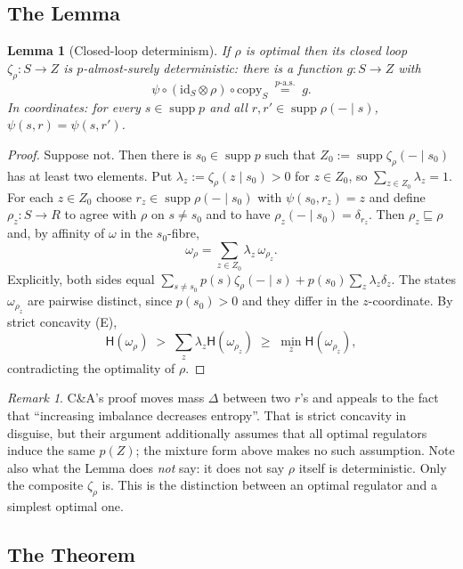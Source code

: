 \documentclass[11pt,a4paper]{article}
\newtheorem{lemma}[theorem]{Lemma}
\theoremstyle{definition}
\theoremstyle{remark}
\newtheorem{remark}[theorem]{Remark}
\newcommand{\copym}[1]{\mathrm{copy}_{#1}}
\newcommand{\id}{\mathrm{id}}
\newcommand{\supp}{\operatorname{supp}}
\newcommand{\aseq}[1]{\overset{#1\text{-a.s.}}{=}}
\newcommand{\ent}{\mathsf{H}}
\newcommand{\refines}{\sqsubseteq}
\begin{document}
\subsection{The Lemma}

\begin{lemma}[Closed-loop determinism]\label{lem:CA}
If $\rho$ is optimal then its closed loop $\zeta_\rho\colon S\to Z$ is $p$-almost-surely deterministic: there is a function $g\colon S\to Z$ with
\[
\psi\circ(\id_S\otimes\rho)\circ\copym{S}\;\aseq{p}\;g .
\]
In coordinates: for every $s\in\supp p$ and all $r,r'\in\supp\rho(-\mid s)$, $\psi(s,r)=\psi(s,r')$.
\end{lemma}
\begin{proof}
Suppose not. Then there is $s_0\in\supp p$ such that $Z_0:=\supp\zeta_\rho(-\mid s_0)$ has at least two elements. Put $\lambda_z:=\zeta_\rho(z\mid s_0)>0$ for $z\in Z_0$, so $\sum_{z\in Z_0}\lambda_z=1$. For each $z\in Z_0$ choose $r_z\in\supp\rho(-\mid s_0)$ with $\psi(s_0,r_z)=z$ and define $\rho_z\colon S\to R$ to agree with $\rho$ on $s\neq s_0$ and to have $\rho_z(-\mid s_0)=\delta_{r_z}$. Then $\rho_z\refines\rho$ and, by affinity of $\omega$ in the $s_0$-fibre,
\[
\omega_\rho=\sum_{z\in Z_0}\lambda_z\,\omega_{\rho_z}.
\]
Explicitly, both sides equal $\sum_{s\neq s_0}p(s)\zeta_\rho(-\mid s)+p(s_0)\sum_z\lambda_z\delta_z$. The states $\omega_{\rho_z}$ are pairwise distinct, since $p(s_0)>0$ and they differ in the $z$-coordinate. By strict concavity (E),
\[
\ent(\omega_\rho)\;>\;\sum_z\lambda_z\ent(\omega_{\rho_z})\;\ge\;\min_z\ent(\omega_{\rho_z}),
\]
contradicting the optimality of $\rho$.
\end{proof}

\begin{remark}
C\&A's proof moves mass $\Delta$ between two $r$'s and appeals to the fact that
``increasing imbalance decreases entropy''. That is strict concavity in
disguise, but their argument additionally assumes that all optimal regulators
induce the same $p(Z)$; the mixture form above makes no such assumption. Note
also what the Lemma does \emph{not} say: it does not say $\rho$ itself is
deterministic. Only the composite $\zeta_\rho$ is. This is the distinction
between an optimal regulator and a simplest optimal one.
\end{remark}

\subsection{The Theorem}
\end{document}
